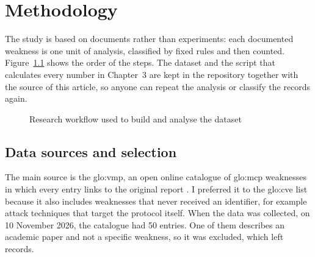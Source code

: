 \chapter{Methodology}

\par The study is based on documents rather than experiments: each documented weakness is one unit of analysis, classified by fixed rules and then counted. Figure~\ref{fig:pipeline} shows the order of the steps. The dataset and the script that calculates every number in Chapter~3 are kept in the repository together with the source of this article, so anyone can repeat the analysis or classify the records again.

\begin{figure}[!htb]
\centering
{}
\caption{Research workflow used to build and analyse the dataset}
\label{fig:pipeline}
\end{figure}

\section{Data sources and selection}

\par The main source is the \acrfull{glo:vmp}, an open online catalogue of \acrshort{glo:mcp} weaknesses in which every entry links to the original report \cite{vmp}. I preferred it to the \acrshort{glo:cve} list because it also includes weaknesses that never received an identifier, for example attack techniques that target the protocol itself. When the data was collected, on 10 November 2026, the catalogue had 50 entries. One of them describes an academic paper and not a specific weakness, so it was excluded, which left \nVmp{} records.


